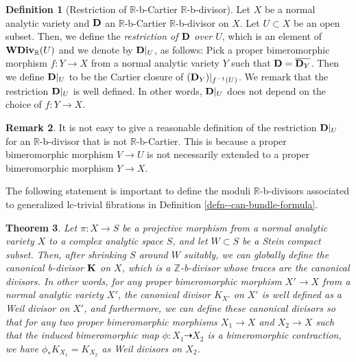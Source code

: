 \documentclass[12pt]{amsart}
\newtheorem{thm}{Theorem}[section]
\theoremstyle{definition}
\newtheorem{defn}[thm]{Definition}
\newtheorem{rem}[thm]{Remark}
\begin{document}
\begin{defn}[Restriction of $\mathbb{R}$-b-Cartier $\mathbb{R}$-b-divisor]\label{defn--rest-b-divisor}
Let $X$ be a normal analytic variety and $\boldsymbol{\rm D}$ an $\mathbb{R}$-b-Cartier $\mathbb{R}$-b-divisor on $X$. 
Let $U \subset X$ be an open subset. 
Then, we define the {\em restriction of $\boldsymbol{\rm D}$ over $U$}, which is an element of $\boldsymbol{\rm WDiv}_{\mathbb{R}}(U)$ and we denote by $\boldsymbol{\rm D}|_{U}$, as follows: 
Pick a proper bimeromorphic morphism $f \colon Y \to X$ from a normal analytic variety $Y$ such that $\boldsymbol{\rm D}=\overline{\boldsymbol{\rm D}_{Y}}$. 
Then we define $\boldsymbol{\rm D}|_{U}$ to be the Cartier closure of $(\boldsymbol{\rm D}_{Y})|_{f^{-1}(U)}$. We remark that the restriction $\boldsymbol{\rm D}|_{U}$ is well defined. 
In other words, $\boldsymbol{\rm D}|_{U}$ does not depend on the choice of $f \colon Y \to X$.  
\end{defn}



\begin{rem}\label{rem--rest-b-divisor}
It is not easy to give a reasonable definition of the restriction $\boldsymbol{\rm D}|_{U}$ for an $\mathbb{R}$-b-divisor that is not $\mathbb{R}$-b-Cartier. 
This is because a proper bimeromorphic morphism $V \to U$ is not necessarily extended to a proper bimeromorphic morphism $Y \to X$.    
\end{rem}

The following statement is important to define the moduli $\mathbb{R}$-b-divisors associated to generalized lc-trivial fibrations in Definition \ref{defn--can-bundle-formula}. 

\begin{thm}\label{thm--welldef-can-b-div}
Let $\pi \colon X \to S$ be a projective morphism from a normal analytic variety $X$ to a complex analytic space $S$, and let $W \subset S$ be a Stein compact subset. 
Then, after shrinking $S$ around $W$ suitably, we can globally define the canonical b-divisor $\boldsymbol{\rm K}$ on $X$, which is a $\mathbb{Z}$-b-divisor whose traces are the canonical divisors.
In other words, for any proper bimeromorphic morphism $X' \to X$ from a normal analytic variety $X'$, the canonical divisor $K_{X'}$ on $X'$ is well defined as a Weil divisor on $X'$, and furthermore, we can define these canonical divisors so that for any two proper bimeromorphic morphisms $X_{1} \to X$ and $X_{2} \to X$ such that the induced bimeromorphic map $\phi \colon X_{1} \dashrightarrow X_{2}$ is a bimeromorphic contraction, we have $\phi_{*}K_{X_{1}}=K_{X_{2}}$ as Weil divisors on $X_{2}$. 
\end{thm}
\end{document}
